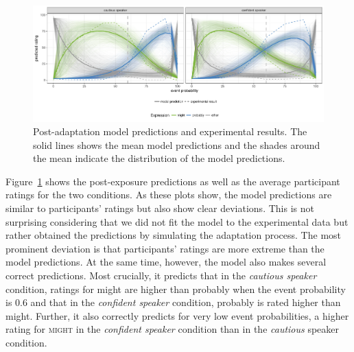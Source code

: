 \documentclass[lucida,biblatex]{sp} %
\begin{document}
\begin{figure}
  \includegraphics[width=\textwidth]{plots/adaptation-posterior-predictions.pdf}
  \caption{Post-adaptation model predictions and experimental results. 
  The solid lines shows the mean model predictions and the shades around the mean indicate the distribution of the model predictions. \label{fig:post-exposure-model}}
\end{figure}

Figure~\ref{fig:post-exposure-model} shows the post-exposure predictions as well as the average participant ratings for the two conditions. As these plots show, the model
predictions are similar to participants' ratings but also show clear deviations. This is not surprising considering that we did not fit the model to the experimental data  but
rather obtained the predictions by simulating the adaptation process. The most prominent deviation is that  participants' ratings are more extreme than the model predictions. 
At the same time, however, the model also makes several correct predictions. Most crucially, it predicts that in the \textit{cautious speaker} condition, ratings for {\sc might} are higher than {\sc probably} when
the event probability is 0.6 and that in the \textit{confident speaker} condition, {\sc probably}  is rated higher than {\sc might}. Further, it also correctly predicts for very low
event probabilities, a higher rating for \textsc{might} in the \textit{confident speaker} condition than in the \textit{cautious} speaker condition.
\end{document}

